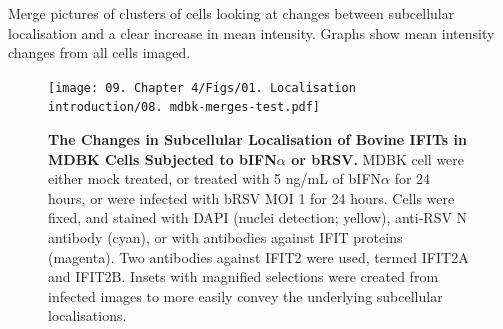 Merge pictures of clusters of cells looking at changes between subcellular localisation and a clear increase in mean intensity. Graphs show mean intensity changes from all cells imaged.

\begin{figure}
    \centering
    \vspace{-15.74707pt}
    \texttt{[image: 09. Chapter 4/Figs/01. Localisation introduction/08. mdbk-merges-test.pdf]}
    \caption[The Changes in Subcellular Localisation of Bovine IFITs in MDBK Cells Subjected to bIFN\(\alpha\) or bRSV.]{\textbf{The Changes in Subcellular Localisation of Bovine IFITs in MDBK Cells Subjected to bIFN\(\alpha\) or bRSV.} MDBK cell were either mock treated, or treated with 5 ng/mL of bIFN\(\alpha\) for 24 hours, or were infected with bRSV MOI 1 for 24 hours. Cells were fixed, and stained with DAPI (nuclei detection; yellow), anti-RSV N antibody (cyan), or with antibodies against IFIT proteins (magenta). Two antibodies against IFIT2 were used, termed IFIT2A and IFIT2B. Insets with magnified selections were created from infected images to more easily convey the underlying subcellular localisations.}
    \label{fig:The Changes in Subcellular Localisation of Bovine IFITs in MDBK Cells Subjected to bIFNa or bRSV}
\end{figure}

